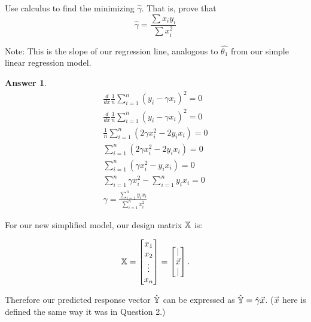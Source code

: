 \documentclass[addpoints, 12pt]{exam}
\theoremstyle{definition}
\newtheorem*{answer}{Answer}
\begin{document}
\begin{questions}
    \setcounter{question}{2} %
\question[2] Use calculus to find the minimizing $\hat{\gamma}$.
That is, prove that 
$$\hat{\gamma} = \frac{\sum x_iy_i}{\sum x_i^2}$$

Note: This is the slope of our regression line, analogous to $\hat{\theta_1}$ from our simple linear regression model.
    \begin{shaded}
    \begin{answer}

\begin{displaymath}
\begin{aligned}
    \frac{d}{d x} \frac{1}{n} \sum^{n}_{i=1} (y_i - \gamma x_{i})^{2} = 0\\
    \frac{d}{d x} \frac{1}{n} \sum^{n}_{i=1} (y_i - \gamma x_{i})^{2} = 0\\
    \frac{1}{n} \sum^{n}_{i=1} (2 \gamma x_i^2 - 2 y_i x_i) = 0\\
    \sum^{n}_{i=1} (2 \gamma x_i^2 - 2 y_i x_i) = 0\\
    \sum^{n}_{i=1} (\gamma x_i^2 - y_i x_i) = 0\\
    \sum^{n}_{i=1} \gamma x_i^2 - \sum^{n}_{i=1} y_i x_i = 0\\
    \gamma = \frac{\sum^{n}_{i=1} y_i x_i}{\sum^{n}_{i=1} x_i^2}
\end{aligned}
\end{displaymath}

    \end{answer}
    \end{shaded}


\newpage
\question[4] 

For our new simplified model, our design matrix $\Bbb{X}$ is:

$$\Bbb{X} = \begin{bmatrix} x_1 \\ x_2 \\ \vdots \\ x_n \end{bmatrix} = \begin{bmatrix} | \\ \vec{x} \\ | \end{bmatrix}.$$

Therefore our predicted response vector $\hat{\Bbb{Y}}$ can be expressed as $\hat{\Bbb{Y}} = \hat{\gamma} \vec{x}$. ($\vec{x}$ here is defined the same way it was in Question 2.) 


\end{questions}
\end{document}
